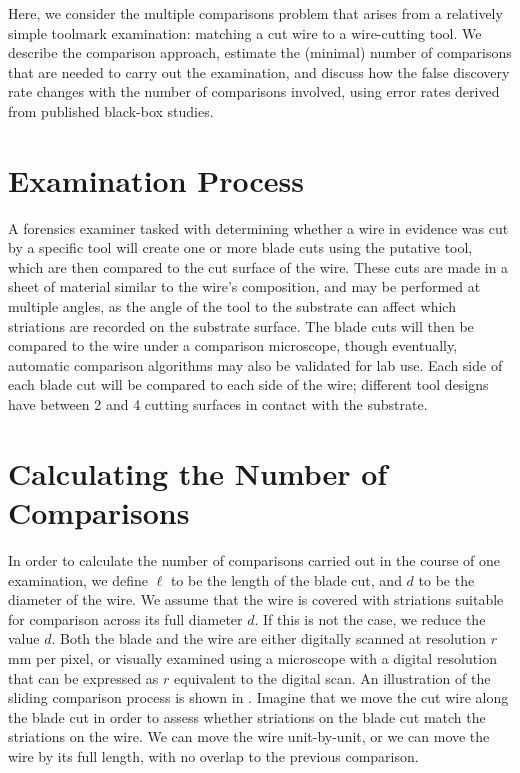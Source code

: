 \documentclass[9pt,twocolumn,twoside]{pnas-new}\usepackage[]{graphicx}\usepackage[dvipsnames]{xcolor}
\begin{document}
Here, we consider the multiple comparisons problem that arises from a relatively simple toolmark examination: matching a cut wire to a wire-cutting tool.
We describe the comparison approach, estimate the (minimal) number of comparisons that are needed to carry out the examination, and discuss how the false discovery rate changes with the number of comparisons involved, using error rates derived from published black-box studies.


\section*{Examination Process}

A forensics examiner tasked with determining whether a wire in evidence was cut by a specific tool will create one or more blade cuts using the putative tool, which are then compared to the cut surface of the wire.
These cuts are made in a sheet of material similar to the wire's composition, and may be performed at multiple angles, as the angle of the tool to the substrate can affect which striations are recorded on the substrate surface.
The blade cuts will then be compared to the wire under a comparison microscope, though eventually, automatic comparison algorithms may also be validated for lab use.
Each side of each blade cut will be compared to each side of the wire;
different tool designs have between 2 and 4 cutting surfaces in contact with the substrate.

\section*{Calculating the Number of Comparisons}

In order to calculate the number of comparisons carried out in the course of one examination, we define $\ell$ to be the length of the blade cut, and $d$ to be the diameter of the wire.
We assume that the wire is covered with striations suitable for comparison across its full diameter $d$.
If this is not the case, we reduce the value $d$.
Both the blade and the wire are either digitally scanned at resolution $r$ mm per pixel, or visually examined using a microscope with a digital resolution that can be expressed as $r$ equivalent to the digital scan.
An illustration of the sliding comparison process is shown in .
Imagine that we move the cut wire along the blade cut in order to assess whether striations on the blade cut match the striations on the wire.
We can move the wire unit-by-unit, or we can move the wire by its full length, with no overlap to the previous comparison.
\end{document}
